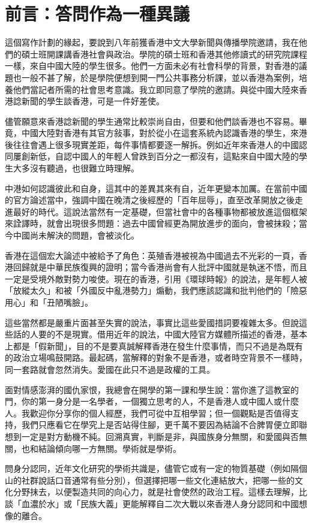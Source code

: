 \section*{前言：答問作為一種異議}
這個寫作計劃的緣起，要說到八年前獲香港中文大學新聞與傳播學院邀請，我在他們的碩士班開課講香港社會與政治。學院的碩士班和香港其他修讀式的研究院課程一樣，來自中國大陸的學生很多。他們一方面未必有社會科學的背景，對香港的議題也一般不甚了解，於是學院便想到開一門公共事務分析課，並以香港為案例，培養他們當記者所需的社會思考意識。我立即同意了學院的邀請。與從中國大陸來香港諗新聞的學生談香港，可是一件好差使。

儘管願意來香港諗新聞的學生通常比較崇尚自由，但要和他們談香港也不容易。畢竟，中國大陸對香港有其官方敍事，對於從小在這套系統內認識香港的學生，來港後往往會遇上很多現實差距，每件事情都要逐一解拆。例如近年來香港人的中國認同屢創新低，自認中國人的年輕人曾跌到百分之一都沒有，這點來自中國大陸的學生大多沒有聽過，也很難立時理解。

中港如何認識彼此和自身，這其中的差異其來有自，近年更變本加厲。在當前中國的官方論述當中，強調中國在晚清之後經歷的「百年屈辱」，直至改革開放之後走進最好的時代。這說法當然有一定基礎，但當社會中的各種事物都被放進這個框架來詮譯時，就會出現很多問題：過去中國曾經更為開放進步的面向，會被抹殺；當今中國尚未解決的問題，會被淡化。

香港在這個宏大論述中被給予了角色：英殖香港被視為中國過去不光彩的一頁，香港回歸就是中華民族復興的證明；當今香港尚會有人批評中國就是執迷不悟，而且一定是受境外敵對勢力唆使。現在的香港，引用《環球時報》的說法，是年輕人被「放縱太久」和被「外國反中亂港勢力」煽動，我們應該認識和批判他們的「險惡用心」和「丑陋嘴臉」。

這些當然都是嚴重片面甚至失實的說法，事實比這些愛國措詞要複雜太多。但說這些話的人要的不是現實。借用近年的說法，中國大陸官方媒體所描述的香港，基本上都是「假新聞」，目的不是要真誠解釋香港在發生什麼事情，而只不過是為既有的政治立場鳴鼓開路。最起碼，當解釋的對象不是香港，或者時空背景不一樣時，同一套路就會忽然消失。愛國在此只不過是政權的工具。

面對情感澎湃的國仇家恨，我總會在開學的第一課和學生說：當你進了這教室的門，你的第一身分是一名學者，一個獨立思考的人，不是香港人或中國人或什麼人。我歡迎你分享你的個人經歷，我們可從中互相學習；但一個觀點是否值得支持，我們只應看它在學究上是否站得住腳，更千萬不要因為結論不合脾胃便立即聯想到一定是對方動機不純。回溯真實，判斷是非，與國族身分無關，和愛國與否無關，也和結論傾向哪一方無關。學術就是學術。

問身分認同，近年文化研究的學術共識是，儘管它或有一定的物質基礎（例如隔個山的社群說話口音通常有些分別），但選擇把哪一些文化連結放大，把哪一些的文化分野抹去，以便製造共同的向心力，就是社會使然的政治工程。這樣去理解，比談「血濃於水」或「民族大義」更能解釋自二次大戰以來香港人身分認同和中國想像的離合。

